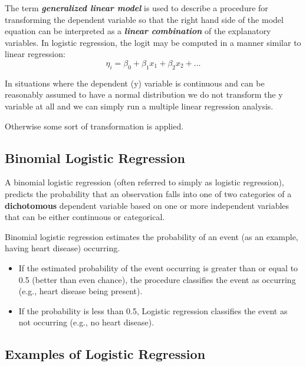 ﻿\documentclass[a4paper,12pt]{article}
\begin{document}
The term \textbf{\textit{generalized linear model}} is used to describe a procedure for
transforming the dependent variable so that the right hand side of the model
equation can be interpreted as a \textbf{\textit{linear combination}} of the explanatory variables. 	In logistic regression, the logit may be computed in a manner similar to linear regression:
\[ \eta_i = \beta_0 + \beta_1x_1 + \beta_2x_2 + \ldots  \]

In situations where the dependent (y) variable is continuous and can be
reasonably assumed to have a normal distribution we do not transform the y
variable at all and we can simply run a multiple linear regression analysis.

Otherwise some sort of transformation is applied.


\subsection{Binomial Logistic Regression} 
A binomial logistic regression (often referred to simply as logistic regression), predicts the probability that an observation falls into one of two categories of a \textbf{dichotomous} dependent variable based on one or more independent variables that can be either continuous or categorical.

Binomial logistic regression estimates the probability of an event (as an example, having heart disease) occurring. 
\begin{itemize}
	\item If the estimated probability of the event occurring is greater than or equal to 0.5 (better than even chance), the procedure classifies the event as occurring (e.g., heart disease being present). \item If the probability is less than 0.5, Logistic regression classifies the event as not occurring (e.g., no heart disease). 
\end{itemize}

\subsection{Examples of Logistic Regression}
\end{document}
